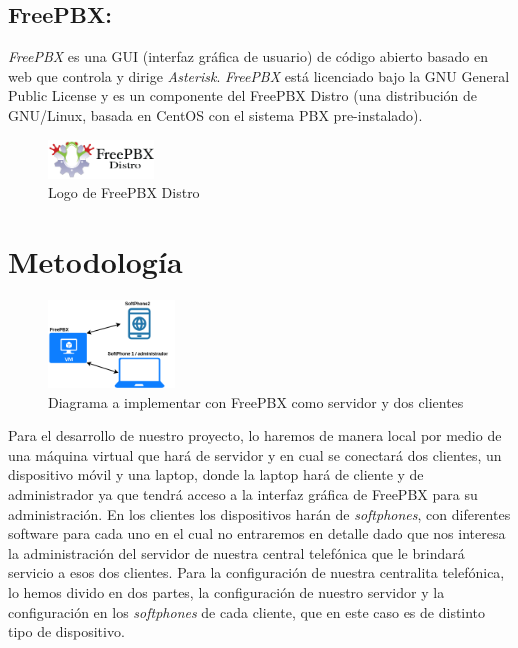 \documentclass[conference]{IEEEtran}
\begin{document}
\subsection{\textbf{ FreePBX:}}
\textit{FreePBX} es una GUI (interfaz gráfica de usuario) de código abierto basado en web que controla y dirige \textit{Asterisk}. \textit{FreePBX} está licenciado bajo la GNU General Public License y es un componente del FreePBX Distro (una distribución de GNU/Linux, basada en CentOS con el sistema PBX pre-instalado).
\begin{figure}[h]
	\centerline{\includegraphics[width=0.25\textwidth]{img/freepbx01.png}}
	\caption{Logo de FreePBX Distro}
	\label{fig:ant04}
\end{figure}


\section{Metodología}\label{sec:met}
\begin{figure}[h]
	\centerline{\includegraphics[width=0.3\textwidth]{img/diagrama01.png}}
	\caption{Diagrama a implementar con FreePBX como servidor y dos clientes}
	\label{fig:ddc01}
\end{figure}

Para el desarrollo de nuestro proyecto, lo haremos de manera local por medio de una máquina virtual que hará de servidor y en cual se conectará dos clientes, un dispositivo móvil y una laptop, donde la laptop hará de cliente y de administrador ya que tendrá acceso a la interfaz gráfica de FreePBX para su administración. En los clientes los dispositivos harán de \textit{softphones}, con diferentes software para cada uno en el cual no entraremos en detalle dado que nos interesa la administración del servidor de nuestra central telefónica que le brindará servicio a esos dos clientes.
Para la configuración de nuestra centralita telefónica, lo hemos divido en dos partes, la configuración de nuestro servidor y la configuración en los \textit{softphones} de cada cliente, que en este caso es de distinto tipo de dispositivo.
\end{document}
